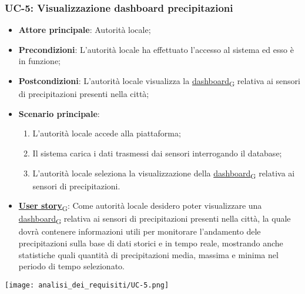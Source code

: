 \subsubsection{UC-5: Visualizzazione dashboard precipitazioni}
\begin{itemize}
	\item \textbf{Attore principale}: Autorità locale;
	\item \textbf{Precondizioni}: L'autorità locale ha effettuato l'accesso al sistema ed esso è in funzione;
	\item \textbf{Postcondizioni}: L'autorità locale visualizza la \href{https://7last.github.io/docs/rtb/documentazione-interna/glossario\#dashboard}{dashboard\textsubscript{G}} relativa
	      ai sensori di precipitazioni presenti nella città;
	\item \textbf{Scenario principale}:
	      \begin{enumerate}
		      \item L'autorità locale accede alla piattaforma;
		      \item Il sistema carica i dati trasmessi dai sensori interrogando il database;
		      \item L'autorità locale seleziona la visualizzazione della \href{https://7last.github.io/docs/rtb/documentazione-interna/glossario\#dashboard}{dashboard\textsubscript{G}} relativa ai sensori di precipitazioni.
	      \end{enumerate}
	\item \href{https://7last.github.io/docs/rtb/documentazione-interna/glossario\#user-story}{\textbf{User story}\textsubscript{G}}:
	      Come autorità locale desidero poter visualizzare una \href{https://7last.github.io/docs/rtb/documentazione-interna/glossario\#dashboard}{dashboard\textsubscript{G}} relativa ai sensori di precipitazioni presenti nella città, la quale
	      dovrà contenere informazioni utili per monitorare l'andamento dele precipitazioni sulla base di dati storici e in tempo reale, mostrando
	      anche statistiche quali quantità di precipitazioni media, massima e minima nel periodo di tempo selezionato.
\end{itemize}
\begin{center}
	\texttt{[image: analisi\_dei\_requisiti/UC-5.png]}
\end{center}


